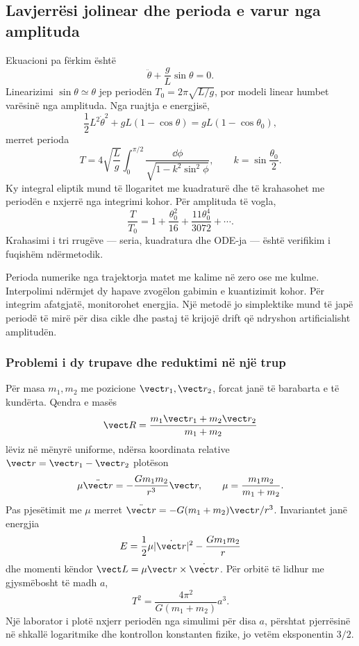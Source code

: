 \subsection{Lavjerrësi jolinear dhe perioda e varur nga amplituda}
Ekuacioni pa fërkim është
\begin{equation}
 \ddot\theta+\frac{g}{L}\sin\theta=0.
\end{equation}
Linearizimi $\sin\theta\simeq\theta$ jep periodën $T_0=2\pi\sqrt{L/g}$, por modeli linear humbet varësinë nga amplituda. Nga ruajtja e energjisë,
\begin{equation}
 \frac12L^2\dot\theta^2+gL(1-\cos\theta)
 =gL(1-\cos\theta_0),
\end{equation}
merret perioda
\begin{equation}
 T=4\sqrt{\frac{L}{g}}
 \int_0^{\pi/2}\frac{\dd\phi}
 {\sqrt{1-k^2\sin^2\phi}},
 \qquad k=\sin\frac{\theta_0}{2}.
\end{equation}
Ky integral eliptik mund të llogaritet me kuadraturë dhe të krahasohet me periodën e nxjerrë nga integrimi kohor. Për amplituda të vogla,
\begin{equation}
 \frac{T}{T_0}=1+\frac{\theta_0^2}{16}
 +\frac{11\theta_0^4}{3072}+\cdots.
\end{equation}
Krahasimi i tri rrugëve --- seria, kuadratura dhe ODE-ja --- është verifikim i fuqishëm ndërmetodik.

Perioda numerike nga trajektorja matet me kalime në zero ose me kulme. Interpolimi ndërmjet dy hapave zvogëlon gabimin e kuantizimit kohor. Për integrim afatgjatë, monitorohet energjia. Një metodë jo simplektike mund të japë periodë të mirë për disa cikle dhe pastaj të krijojë drift që ndryshon artificialisht amplitudën.

\subsubsection{Problemi i dy trupave dhe reduktimi në një trup}
Për masa $m_1,m_2$ me pozicione $\vect r_1,\vect r_2$, forcat janë të barabarta e të kundërta. Qendra e masës
\begin{equation}
 \vect R=\frac{m_1\vect r_1+m_2\vect r_2}{m_1+m_2}
\end{equation}
lëviz në mënyrë uniforme, ndërsa koordinata relative $\vect r=\vect r_1-\vect r_2$ plotëson
\begin{equation}
 \mu\ddot{\vect r}=-\frac{Gm_1m_2}{r^3}\vect r,
 \qquad \mu=\frac{m_1m_2}{m_1+m_2}.
\end{equation}
Pas pjesëtimit me $\mu$ merret $\ddot{\vect r}=-G(m_1+m_2)\vect r/r^3$. Invariantet janë energjia
\begin{equation}
 E=\frac12\mu|\dot{\vect r}|^2-\frac{Gm_1m_2}{r}
\end{equation}
dhe momenti këndor $\vect L=\mu\vect r\times\dot{\vect r}$. Për orbitë të lidhur me gjysmëbosht të madh $a$,
\begin{equation}
 T^2=\frac{4\pi^2}{G(m_1+m_2)}a^3.
\end{equation}
Një laborator i plotë nxjerr periodën nga simulimi për disa $a$, përshtat pjerrësinë në shkallë logaritmike dhe kontrollon konstanten fizike, jo vetëm eksponentin $3/2$.

